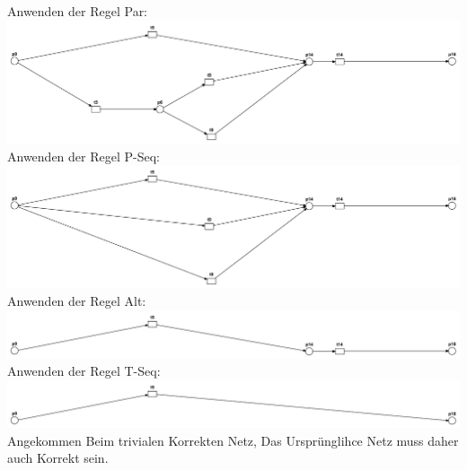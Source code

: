      Anwenden der Regel Par:\\
 \includegraphics[scale=0.3]{Teilaufgaben/par2.pdf}\\
 
     Anwenden der Regel P-Seq:\\
 \includegraphics[scale=0.3]{Teilaufgaben/pseq3.pdf}\\
 
      Anwenden der Regel Alt:\\
 \includegraphics[scale=0.3]{Teilaufgaben/alt1.pdf}\\
 
       Anwenden der Regel T-Seq:\\
 \includegraphics[scale=0.3]{Teilaufgaben/tseq2.pdf}\\
 
 Angekommen Beim trivialen Korrekten Netz, Das Ursprünglihce Netz muss daher auch Korrekt sein.